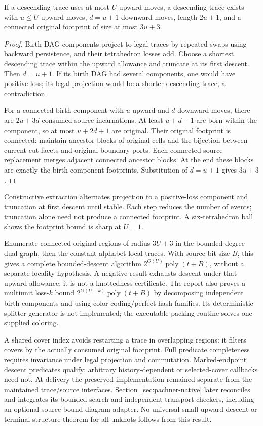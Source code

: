 \begin{proposition}
If a descending trace uses at most $U$ upward moves, a descending trace exists
with $u\le U$ upward moves, $d=u+1$ downward moves, length $2u+1$, and a
connected original footprint of size at most $3u+3$.
\end{proposition}
\begin{proof}
Birth-DAG components project to legal traces by repeated swaps using
backward persistence, and their tetrahedron losses add. Choose a shortest
descending trace within the upward allowance and truncate at its first
descent. Then $d=u+1$. If its birth DAG had several components, one would
have positive loss; its legal projection would be a shorter descending
trace, a contradiction.

For a connected birth component with $u$ upward and $d$ downward moves,
there are $2u+3d$ consumed source incarnations. At least $u+d-1$ are born
within the component, so at most $u+2d+1$ are original. Their original
footprint is connected: maintain ancestor blocks of original cells and
the bijection between current cut facets and original boundary ports.
Each connected source replacement merges adjacent connected ancestor blocks.
At the end these blocks are exactly the birth-component footprints.
Substitution of $d=u+1$ gives $3u+3$.
\end{proof}

Constructive extraction alternates projection to a positive-loss component
and truncation at first descent until stable. Each step reduces the number
of events; truncation alone need not produce a connected footprint.
A six-tetrahedron ball shows the footprint bound is sharp at $U=1$.

Enumerate connected original regions of radius $3U+3$ in the bounded-degree
dual graph, then the constant-alphabet local traces. With source-bit size
$B$, this gives a complete bounded-descent algorithm
$2^{O(U)}\operatorname{poly}(t+B)$, without a separate locality hypothesis.
A negative result exhausts descent under that upward allowance; it is not
a knottedness certificate. The report also proves a multiunit loss-$k$
bound $2^{O(U+k)}\operatorname{poly}(t+B)$ by decomposing independent birth
components and using color coding/perfect hash families. Its deterministic
splitter generator is not implemented; the executable packing routine
solves one supplied coloring.

A shared cover index avoids restarting a trace in overlapping regions:
it filters covers by the actually consumed original footprint. Full
predicate completeness requires invariance under legal projection and
commutation. Marked-endpoint descent predicates qualify; arbitrary
history-dependent or selected-cover callbacks need not. At delivery the preserved implementation remained separate from the
maintained trace/source interfaces. Section~\ref{sec:pachner-native} later
reconciles and integrates its bounded search and independent transport
checkers, including an optional source-bound diagram adapter. No universal small-upward descent or
terminal structure theorem for all unknots follows from this result.

